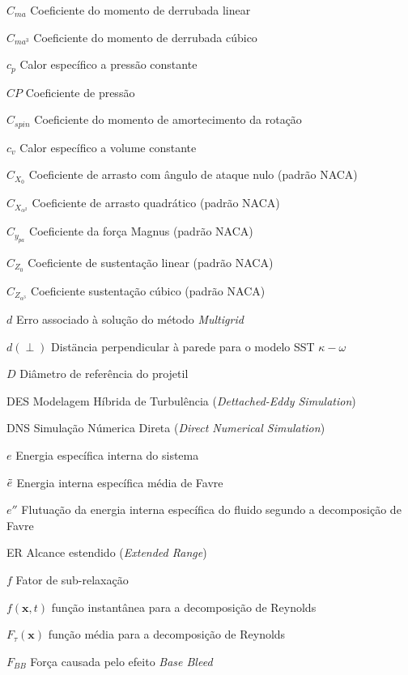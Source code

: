 \begin{siglas}
    \item[\(C_{ma}\)] Coeficiente do momento de derrubada linear
    \item[\(C_{ma^3}\)] Coeficiente do momento de derrubada cúbico
    \item[\(c_p\)] Calor específico a pressão constante
    \item[\(CP\)] Coeficiente de pressão
    \item[\(C_{spin}\)] Coeficiente do momento de amortecimento da rotação
    \item[\(c_v\)] Calor específico a volume constante
    \item[\(C_{X_0}\)] Coeficiente de arrasto com ângulo de ataque nulo (padrão NACA)
    \item[\(C_{X_{\alpha^2}}\)] Coeficiente de arrasto quadrático (padrão NACA)
    \item[\(C_{y_{pa}}\)] Coeficiente da força Magnus (padrão NACA)
    \item[\(C_{Z_0}\)] Coeficiente de sustentação linear (padrão NACA)
    \item[\(C_{Z_{\alpha^3}}\)] Coeficiente sustentação cúbico (padrão NACA)
    \item[\(d\)] Erro associado à solução do método \textit{Multigrid}
    \item[\(d(\perp)\)] Distäncia perpendicular à parede para o modelo SST $\kappa-\omega$
    \item[\(D\)] Diâmetro de referência do projetil
    \item[DES] Modelagem Híbrida de Turbulência (\textit{Dettached-Eddy Simulation})
    \item[DNS] Simulação Númerica Direta (\textit{Direct Numerical Simulation})
    \item[\(e\)] Energia específica interna do sistema
    \item[\(\Tilde{e}\)] Energia interna específica média de Favre
    \item[\(e''\)] Flutuação da energia interna específica do fluido segundo a decomposição de Favre
    \item[ER] Alcance estendido (\textit{Extended Range})
    \item[\(f\)] Fator de sub-relaxação
    \item[\(f(\textbf{x},t)\)] função instantânea para a decomposição de Reynolds
    \item[\(F_{\tau}(\textbf{x})\)] função média para a decomposição de Reynolds
    \item[\(F_{BB}\)] Força causada pelo efeito \textit{Base Bleed}

\end{siglas}
